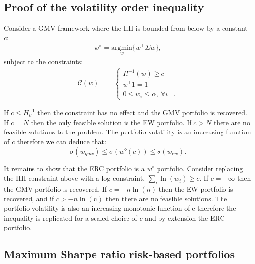\documentclass[
]{article}
\begin{document}
\hypertarget{volineq}{%
\subsection{Proof of the volatility order inequality}\label{volineq}}

Consider a GMV framework where the IHI is bounded from below by a constant \(c\):
\begin{align*} 
w^\diamond = \underset{w}{\text{argmin}} \Big \{ w^\intercal \Sigma w \Big \},
\end{align*}
subject to the constraints:
\begin{align*}
\mathcal{C}(w) &= 
\begin{cases}
H^{-1}(w) \geq c \\
w^\intercal \underline{1} = 1 \;\; \\
0 \leq w_i \leq \alpha, \; \forall i \;\;\; .
\end{cases}
\end{align*}

If \(c \leq H^{-1}_{lb}\) then the constraint has no effect and the GMV portfolio is recovered. If
\(c = N\) then the only feasible solution is the EW portfolio. If \(c > N\) there are no feasible
solutions to the problem. The portfolio volatility is an increasing function of \(c\) therefore we can
deduce that: \[\sigma(w_{gmv}) \leq \sigma(w^\diamond(c)) \leq \sigma (w_{ew}).\]

It remains to show that the ERC portfolio is a \(w^\diamond\) portfolio. Consider replacing the IHI
constraint above with a log-constraint, \(\sum_i \ln(w_i) \geq c\). If \(c = - \infty\) then the GMV
portfolio is recovered. If \(c = -n \ln(n)\) then the EW portfolio is recovered, and if \(c > -n\ln(n)\)
then there are no feasible solutions. The portfolio volatility is also an increasing monotonic
function of c therefore the inequality is replicated for a scaled choice of \(c\) and by extension the
ERC portfolio.

\hypertarget{msrrbport}{%
\subsection{Maximum Sharpe ratio risk-based portfolios}\label{msrrbport}}
\end{document}
